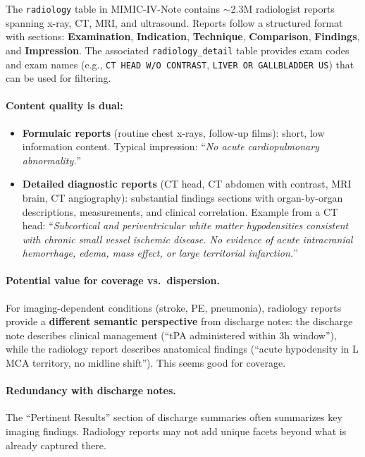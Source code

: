 \documentclass[11pt,a4paper]{article}
\newcommand{\field}[1]{\nolinkurl{#1}}
\begin{document}
The \field{radiology} table in MIMIC-IV-Note contains $\sim$2.3M radiologist reports spanning x-ray, CT, MRI, and ultrasound.  Reports follow a structured format with sections: \textbf{Examination}, \textbf{Indication}, \textbf{Technique}, \textbf{Comparison}, \textbf{Findings}, and \textbf{Impression}.  The associated \field{radiology\_detail} table provides exam codes and exam names (e.g., \texttt{CT HEAD W/O CONTRAST}, \texttt{LIVER OR GALLBLADDER US}) that can be used for filtering.

\paragraph{Content quality is dual:}
\begin{itemize}[itemsep=2pt, parsep=1pt]
	\item \textbf{Formulaic reports} (routine chest x-rays, follow-up films): short, low information content.  Typical impression: ``\emph{No acute cardiopulmonary abnormality.}''
	\item \textbf{Detailed diagnostic reports} (CT head, CT abdomen with contrast, MRI brain, CT angiography): substantial findings sections
	      with organ-by-organ descriptions, measurements, and clinical correlation.  Example from a CT head: ``\emph{Subcortical and periventricular white matter hypodensities consistent with chronic small vessel ischemic disease.  No evidence of acute intracranial hemorrhage, edema, mass effect, or large territorial infarction.}''
\end{itemize}

\paragraph{Potential value for coverage vs.\ dispersion.}
For imaging-dependent conditions (stroke, PE, pneumonia), radiology reports provide a \textbf{different semantic perspective} from discharge notes: the discharge note describes clinical management (``tPA administered within 3h window''), while the radiology report describes anatomical findings (``acute hypodensity in L MCA territory, no midline shift''). This seems good for coverage.

\paragraph{Redundancy with discharge notes.}  The ``Pertinent Results'' section of discharge summaries often summarizes key imaging findings.
Radiology reports may not add unique facets beyond what is already captured there.
\end{document}
